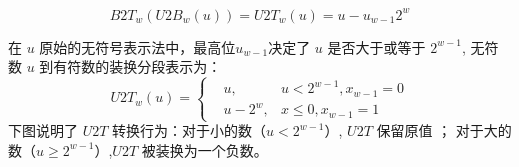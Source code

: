 \documentclass[11pt,a4paper]{article}
\begin{document}
    \begin{equation}
      B2T_w\left( U2B_w \left( u \right) \right) = U2T_w \left( u \right) = u - u_{w-1} 2^w
    \end{equation}

    在 $u$ 原始的无符号表示法中，最高位$u_{w-1}$决定了 $u$ 是否大于或等于 $2^{w-1}$, 无符数 $u$ 到有符数的装换分段表示为：
    \begin{equation}
       U2T_w \left( u \right)=\left\{
        \begin{aligned}
          & u, & u<2^{w-1},x_{w-1}=0  \\
          & u-2^w,  & x \leq 0,x_{w-1}=1
        \end{aligned}
        \right.
    \end{equation}
    下图说明了 $U2T$ 转换行为：对于小的数（$u<2^{w-1}$）, $U2T$ 保留原值 ； 对于大的数（$u \geq 2^{w-1}$）,$U2T$ 被装换为一个负数。
\end{document}
